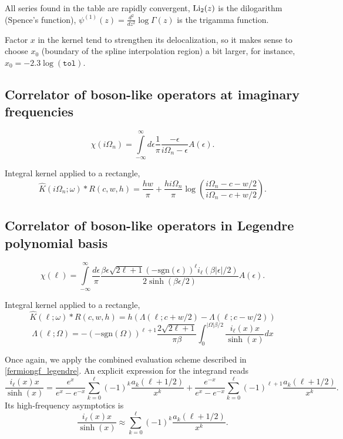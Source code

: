 \documentclass[]{article}
\begin{document}
All series found in the table are rapidly convergent, $\mathrm{Li}_2(z)$ is the dilogarithm (Spence's function),
$\psi^{(1)}(z) = \frac{d^2}{dz^2}\log\Gamma(z)$ is the trigamma function.

Factor $x$ in the kernel tend to strengthen its delocalization, so
it makes sense to choose $x_0$ (boundary of the spline interpolation region)
a bit larger, for instance, $x_0=-2.3\log(\mathtt{tol})$.

\subsection{Correlator of boson-like operators at imaginary frequencies}
\label{bosoncorr_imfreq}
\begin{equation}
\chi(i\Omega_n) = \int\limits_{-\infty}^\infty
d\epsilon \frac{1}{\pi}\frac{-\epsilon}{i\Omega_n-\epsilon} A(\epsilon).
\end{equation}

Integral kernel applied to a rectangle,
\begin{equation}
\hat K(i\Omega_n;\omega)*R(c,w,h) = 
\frac{hw}{\pi} + \frac{hi\Omega_n}{\pi}\log\left(\frac{i\Omega_n - c - w/2}{i\Omega_n - c + w/2}\right).
\end{equation}

\subsection{Correlator of boson-like operators in Legendre polynomial basis}
\label{bosoncorr_legendre}
\begin{equation}
	\chi(\ell) = \int\limits_{-\infty}^\infty
	\frac{d\epsilon}{\pi}
	\frac{\beta\epsilon\sqrt{2\ell+1}(-\mathrm{sgn}(\epsilon))^\ell i_{\ell}(\beta|\epsilon|/2)}
	{2\sinh(\beta\epsilon/2)} A(\epsilon).
\end{equation}

Integral kernel applied to a rectangle,
\begin{equation}
	\hat K(\ell;\omega)*R(c,w,h) = h (\Lambda(\ell;c+w/2) - \Lambda(\ell;c-w/2))
\end{equation}
\begin{equation}
	\Lambda(\ell;\Omega) = -(-\mathrm{sgn}(\Omega))^{\ell+1}
	\frac{2\sqrt{2\ell+1}}{\pi\beta}
	\int_0^{|\Omega|\beta/2} \frac{i_\ell(x) x}{\sinh(x)} dx
\end{equation}

Once again, we apply the combined evaluation scheme described in
\ref{fermiongf_legendre}. An explicit expression for the integrand reads
\begin{equation}\label{il_x_sinh_series}
	\frac{i_\ell(x) x}{\sinh(x)} =
	\frac{e^x}{e^x-e^{-x}}\sum_{k=0}^\ell(-1)^k
	\frac{a_k(\ell+1/2)}{x^k} +
	\frac{e^{-x}}{e^x-e^{-x}}\sum_{k=0}^\ell(-1)^{\ell+1}
	\frac{a_k(\ell+1/2)}{x^k}.
\end{equation}
Its high-frequency asymptotics is
\begin{equation}
	\frac{i_\ell(x) x}{\sinh(x)} \approx
		\sum_{k=0}^\ell(-1)^k \frac{a_k(\ell+1/2)}{x^k}.
\end{equation}
\end{document}
